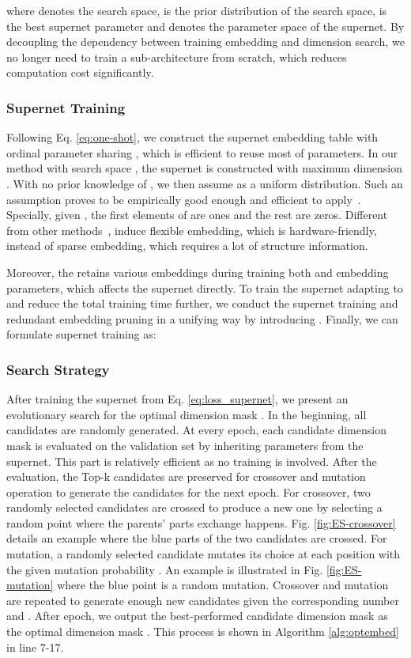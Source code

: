 \documentclass[sigconf]{acmart}
\begin{document}
where  denotes the search space,  is the prior distribution of the search space,  is the best supernet parameter and  denotes the parameter space of the supernet. By decoupling the dependency between training embedding and dimension search, we no longer need to train a sub-architecture from scratch, which reduces computation cost significantly. 

\subsubsection{Supernet Training} Following Eq. \ref{eq:one-shot}, we construct the supernet embedding table  with ordinal parameter sharing \cite{AutoIAS}, which is efficient to reuse most of parameters. In our method with search space , the supernet is constructed with maximum dimension . With no prior knowledge of , we then assume  as a uniform distribution. Such an assumption proves to be empirically good enough and efficient to apply~\cite{One-shot}. Specially, given , the first  elements of  are ones and the rest are zeros. Different from other methods~\cite{PEP,single-shot},  induce flexible embedding, which is hardware-friendly, instead of sparse embedding, which requires a lot of structure information.

Moreover, the  retains various embeddings during training both  and embedding parameters, which affects the supernet directly. To train the supernet adapting to  and reduce the total training time further, we conduct the supernet training and redundant embedding pruning in a unifying way by introducing . Finally, we can formulate supernet training as:





\subsubsection{Search Strategy} After training the supernet  from Eq. \ref{eq:loss_supernet}, we present an evolutionary search for the optimal dimension mask . In the beginning, all candidates are randomly generated. At every epoch, each candidate dimension mask  is evaluated on the validation set  by inheriting parameters from the supernet. This part is relatively efficient as no training is involved. After the evaluation, the Top-k candidates are preserved for crossover and mutation operation to generate the candidates for the next epoch. For crossover, two randomly selected candidates are crossed to produce a new one by selecting a random point where the parents’ parts exchange happens. Fig. \ref{fig:ES-crossover} details an example where the blue parts of the two candidates are crossed. For mutation, a randomly selected candidate mutates its choice at each position with the given mutation probability . An example is illustrated in Fig. \ref{fig:ES-mutation} where the blue point is a random mutation. Crossover and mutation are repeated to generate enough new candidates given the corresponding number  and . After  epoch, we output the best-performed candidate dimension mask as the optimal dimension mask . This process is shown in Algorithm \ref{alg:optembed} in line 7-17. \vspace{-10pt}
\end{document}
